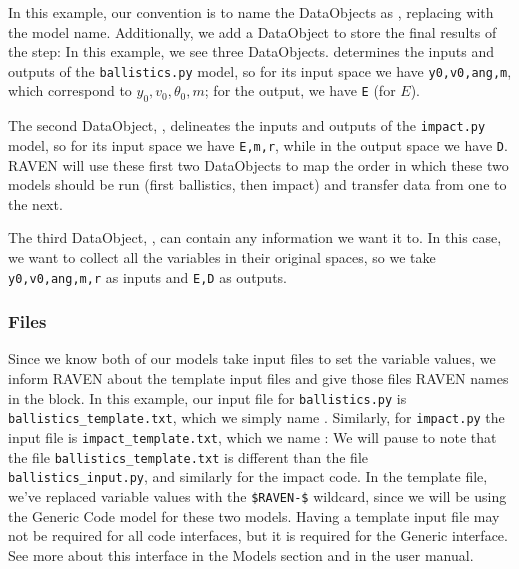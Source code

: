 In this
example, our convention is to name the  DataObjects as , replacing
 with the model name.  Additionally, we add a DataObject to store the final results of the
 step:
In this example, we see three DataObjects.   determines the inputs and outputs of the
\texttt{ballistics.py} model, so for its input space we have \texttt{y0,v0,ang,m}, which correspond to
$y_0,v_0,\theta_0,m$; for the output, we have \texttt{E} (for $E$).

The second DataObject, , delineates the inputs and outputs of the \texttt{impact.py}
model, so for its input space we have \texttt{E,m,r}, while in the output space we have \texttt{D}.  RAVEN
will use these first two DataObjects to map the order in which these two models should be run (first
ballistics, then impact) and transfer data from one to the next.

The third DataObject, , can contain any information we want it to.  In this case,
we want to collect all the variables in their original spaces, so we take \texttt{y0,v0,ang,m,r} as inputs and
\texttt{E,D} as outputs.


\subsubsection{Files}
Since we know both of our models take input files to set the variable values, we inform RAVEN about the
template input files and
give those files RAVEN names in the  block.  In this example, our input file for \texttt{ballistics.py} is
\texttt{ballistics\_template.txt}, which we simply name .  Similarly,
for \texttt{impact.py} the input file is \texttt{impact\_template.txt}, which we name
:
We will pause to note that the file \texttt{ballistics\_template.txt} is different than the file
\texttt{ballistics\_input.py}, and similarly for the impact code.  In the template file, we've replaced
variable values with the \texttt{\$RAVEN-\$} wildcard, since we will be using the Generic Code model for these
two models.  Having a template input file may not be required for all code interfaces, but it is required for
the Generic interface. See more about this interface in the Models section and in the user manual.


